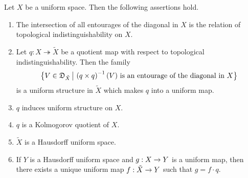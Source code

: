 \documentclass[10pt]{amsart}
\begin{document}
\begin{theorem}\label{theorem:Kolmogorov_quotients_of_uniform_spaces}
	Let $X$ be a uniform space. Then the following assertions hold.
	\begin{enumerate}[label=\emph{\textbf{(\arabic*)}}, leftmargin=3.0em]
		\item The intersection of all entourages of the diagonal in $X$ is the relation of topological indistinguishability on $X$.
		\item Let $q:X\twoheadrightarrow \tilde{X}$ be a quotient map with respect to topological indistinguishability. Then the family
		      $$\big\{V \in {\mathfrak D}_{\tilde{X}}\,\big|\,\left(q\times q\right)^{-1}(V)\mbox{ is an entourage of the diagonal in }X\big\}$$
		      is a uniform structure in $\tilde{X}$ which makes $q$ into a uniform map.
		\item $q$ induces uniform structure on $X$.
		\item $q$ is a Kolmogorov quotient of $X$.
		\item $\tilde{X}$ is a Hausdorff uniform space.
		\item If $Y$ is a Hausdorff uniform space and $g:X\rightarrow Y$ is a uniform map, then there exists a unique uniform map $f:\tilde{X} \rightarrow Y$ such that $g = f \cdot q$.
	\end{enumerate}
\end{theorem}
\end{document}
